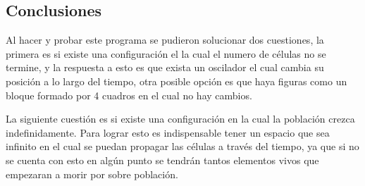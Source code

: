 \subsection{Conclusiones}
Al hacer y probar este programa se pudieron solucionar dos cuestiones, la primera es si existe una configuración el la cual el numero de células no se termine, y la respuesta a esto es que exista un oscilador el cual cambia su posición a lo largo del tiempo, otra posible opción es que haya figuras como un bloque formado por 4 cuadros en el cual no hay cambios.

La siguiente cuestión es si existe una configuración en la cual la población crezca indefinidamente. Para lograr esto es indispensable tener un espacio que sea infinito en el cual se puedan propagar las células a través del tiempo, ya que si no se cuenta con esto en algún punto se tendrán tantos elementos vivos que empezaran a morir por sobre población.
